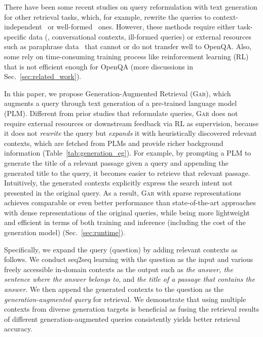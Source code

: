 \documentclass[11pt,a4paper]{article}
\newcommand{\ours}{\textsc{Gar}\xspace}
\begin{document}
 There have been some recent studies on query reformulation with text generation for other retrieval tasks, which, for example, rewrite the queries to context-independent~\cite{yu2020few,lin2020query,vakulenko2020question} or well-formed~\cite{liu2019generative} ones.
However, these methods require either task-specific data (\eg, conversational contexts, ill-formed queries) or external resources such as paraphrase data~\cite{zaiem2019sequence,wang2020deep} that cannot or do not transfer well to OpenQA.
Also, some rely on time-consuming training process like reinforcement learning (RL)~\cite{nogueira-cho-2017-task,liu2019generative,wang2020deep} that is not efficient enough for OpenQA (more discussions in Sec.~\ref{sec:related_work}).


In this paper, we propose Generation-Augmented Retrieval (\ours), which augments a query through text generation of a pre-trained language model (PLM).
Different from prior studies that reformulate queries, \ours does not require external resources or downstream feedback via RL as supervision, because it does not \textit{rewrite} the query but \textit{expands} it with heuristically discovered relevant contexts, which are fetched from PLMs and provide richer background information (Table~\ref{tab:generation_eg}). 
For example, by prompting a PLM to generate the title of a relevant passage given a query and appending the generated title to the query, it becomes easier to retrieve that relevant passage.
Intuitively, the generated contexts explicitly express the search intent not presented in the original query.
As a result, \ours with sparse representations achieves comparable or even better performance than state-of-the-art approaches~\cite{karpukhin2020dense,guu2020realm} with dense representations of the original queries, while being more lightweight and efficient in terms of both training and inference (including the cost of the generation model) (Sec.~\ref{sec:runtime}).


Specifically, we expand the query (question) by adding relevant contexts as follows.
We conduct seq2seq learning with the question as the input and various freely accessible in-domain contexts as the output such as \textit{the answer, the sentence where the answer belongs to}, and \textit{the title of a passage that contains the answer}. 
We then append the generated contexts to the question as the \textit{generation-augmented query} for retrieval.
We demonstrate that using multiple contexts from diverse generation targets is beneficial 
as fusing the retrieval results of different generation-augmented queries consistently yields better retrieval accuracy.
\end{document}
